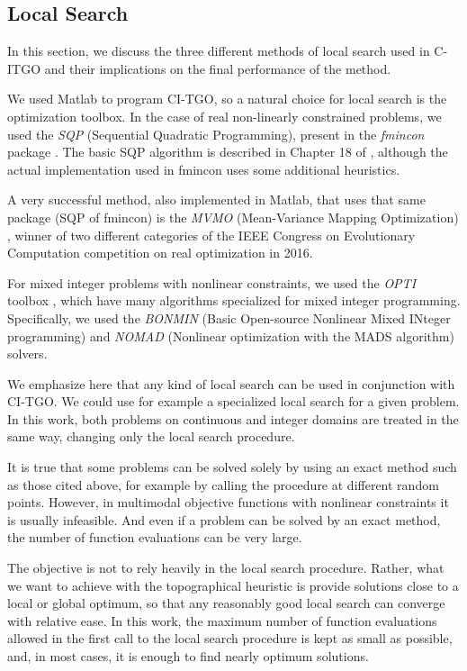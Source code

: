 \subsection{Local Search}

In this section, we discuss the three different methods of local search used in C-ITGO and their implications on the final performance of the method.

We used Matlab to program CI-TGO, so a natural choice for local search is the optimization toolbox. In the case of real non-linearly constrained problems, we used the \textit{SQP} (Sequential Quadratic Programming), present in the \textit{fmincon} package \citep{fmincon}. The basic SQP algorithm is described in Chapter 18 of \cite{Nocedal}, although the actual implementation used in fmincon uses some additional heuristics. 

A very successful method, also implemented in Matlab, that uses that same package (SQP of fmincon) is the \textit{MVMO} (Mean-Variance Mapping Optimization) \citep{MVMO}, winner of two different categories of the IEEE Congress on Evolutionary Computation competition on real optimization in 2016.

For mixed integer problems with nonlinear constraints, we used the \textit{OPTI} toolbox \citep{OPTI}, which have many algorithms specialized for mixed integer programming. Specifically, we used the \textit{BONMIN} (Basic Open-source Nonlinear Mixed INteger programming) \citep{BONMIN} and \textit{NOMAD} (Nonlinear optimization with the MADS algorithm) \citep{NOMAD} solvers.

We emphasize here that any kind of local search can be used in conjunction with CI-TGO. We could use for example a specialized local search for a given problem. In this work, both problems on continuous and integer domains are treated in the same way, changing only the local search procedure.

It is true that some problems can be solved solely by using an exact method such as those cited above, for example by calling the procedure at different random points. However, in multimodal objective functions with nonlinear constraints it is usually infeasible. And even if a problem can be solved by an exact method, the number of function evaluations can be very large.

The objective is not to rely heavily in the local search procedure. Rather, what we want to achieve with the topographical heuristic is provide solutions close to a local or global optimum, so that any reasonably good local search can converge with relative ease. In this work, the maximum number of function evaluations allowed in the first call to the local search procedure is kept as small as possible, and, in most cases, it is enough to find nearly optimum solutions.



